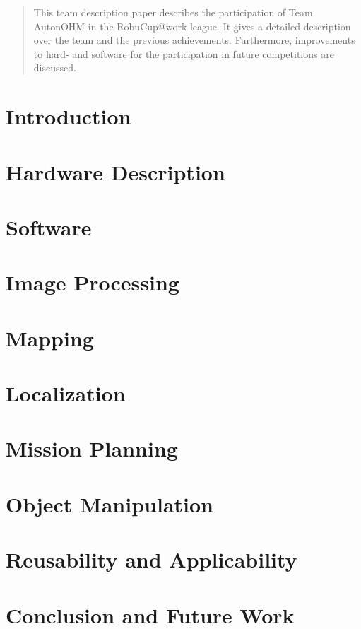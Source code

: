 \documentclass[runningheads,a4paper]{llncs}
\begin{document}
\begin{abstract}
This team description paper describes the participation of Team AutonOHM in the RobuCup$@$work league. It gives a detailed description over the team and the previous achievements. Furthermore, improvements to hard- and software for the participation in future competitions are discussed. 
\end{abstract}

\section{Introduction}


\section{Hardware Description}


\newpage
\section{Software}


\section{Image Processing}


\newpage
\section{Mapping}
\label{sec:slam}


\section{Localization}
\label{sec:loc}


\section{Mission Planning}
\label{sec:mis}


\newpage
\section{Object Manipulation}


\section{Reusability and Applicability}


\section{Conclusion and Future Work}





\clearpage


\clearpage
\end{document}
